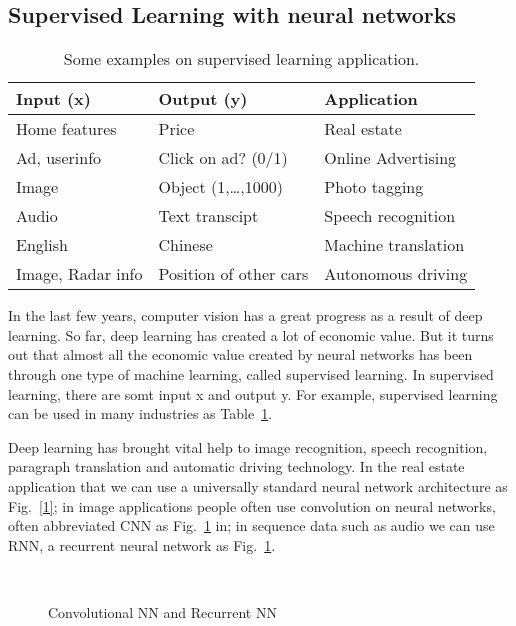 \documentclass[a4paper]{article}
\begin{document}
\subsection{Supervised Learning with neural networks}
\begin{table}[h]
\small
\renewcommand\arraystretch{1.2}
\centering
\begin{tabular}{|l|l|l|}
\hline
Input (x) & Output (y) & Application \\
\hline
Home features & Price & Real estate \\

Ad, userinfo & Click on ad? (0/1) & Online Advertising \\

Image & Object (1,\dots ,1000) & Photo tagging \\

Audio & Text transcipt & Speech recognition \\

English & Chinese & Machine translation \\

Image, Radar info & Position of other cars & Autonomous driving \\
\hline
\end{tabular} 
\caption{Some examples on supervised learning application.} 
\label{tab1}
\end{table}
In the last few years, computer vision has a great progress as a result of deep learning. So far, deep learning has created a lot of economic value. But it turns out that almost all the economic value created by neural networks has been through one type of machine learning, called supervised learning. In supervised learning, there are somt input x and output y. For example, supervised learning can be used in many industries as Table~\ref{tab1}.
\par
Deep learning has brought vital help to image recognition, speech recognition, paragraph translation and automatic driving technology. In the real estate application that we can use a universally standard neural network architecture as Fig.~\ref{1}; in image applications people often use convolution on neural networks, often abbreviated CNN as Fig.~\ref{2} in\cite{note}; in sequence data such as audio we can use RNN, a recurrent neural network as Fig.~\ref{2}.
\begin{figure}[!htb]
    \centering
    \quad
    \\
    \caption{Convolutional NN and Recurrent NN}
    \label{2}
\end{figure}
\end{document}
